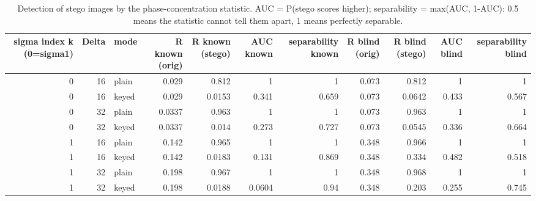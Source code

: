 \begin{table}[htbp]
\caption{Detection of stego images by the phase-concentration statistic. AUC = P(stego scores higher); separability = max(AUC, 1-AUC): 0.5 means the statistic cannot tell them apart, 1 means perfectly separable.}
\label{tab:steganalysis}
\begin{tabular}{rrlrrrrrrrr}
\toprule
sigma index k (0=sigma1) & Delta & mode & R known (orig) & R known (stego) & AUC known & separability known & R blind (orig) & R blind (stego) & AUC blind & separability blind \\
\midrule
0 & 16 & plain & 0.029 & 0.812 & 1 & 1 & 0.073 & 0.812 & 1 & 1 \\
0 & 16 & keyed & 0.029 & 0.0153 & 0.341 & 0.659 & 0.073 & 0.0642 & 0.433 & 0.567 \\
0 & 32 & plain & 0.0337 & 0.963 & 1 & 1 & 0.073 & 0.963 & 1 & 1 \\
0 & 32 & keyed & 0.0337 & 0.014 & 0.273 & 0.727 & 0.073 & 0.0545 & 0.336 & 0.664 \\
1 & 16 & plain & 0.142 & 0.965 & 1 & 1 & 0.348 & 0.966 & 1 & 1 \\
1 & 16 & keyed & 0.142 & 0.0183 & 0.131 & 0.869 & 0.348 & 0.334 & 0.482 & 0.518 \\
1 & 32 & plain & 0.198 & 0.967 & 1 & 1 & 0.348 & 0.968 & 1 & 1 \\
1 & 32 & keyed & 0.198 & 0.0188 & 0.0604 & 0.94 & 0.348 & 0.203 & 0.255 & 0.745 \\
\bottomrule
\end{tabular}
\end{table}
